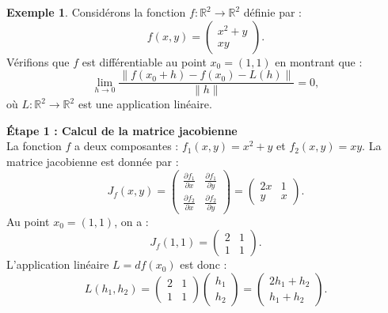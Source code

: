 \documentclass[a4paper,12pt,openany]{book}
\theoremstyle{plain}
\theoremstyle{definition}
\newtheorem{exemple}[theorem]{Exemple}
\theoremstyle{remark}
\theoremstyle{nbstyle}
\begin{document}
	
	\begin{exemple}
		Considérons la fonction \( f : \mathbb{R}^2 \to \mathbb{R}^2 \) définie par :
		\[
		f(x, y) = \begin{pmatrix}
		x^2 + y \\
		xy
		\end{pmatrix}.
		\]
		Vérifions que \( f \) est différentiable au point \( x_0 = (1, 1) \) en montrant que :
		\[
		\lim_{h \to 0} \frac{\lVert f(x_0 + h) - f(x_0) - L(h) \rVert}{\lVert h \rVert} = 0,
		\]
		où \( L : \mathbb{R}^2 \to \mathbb{R}^2 \) est une application linéaire.
		
		\textbf{Étape 1 : Calcul de la matrice jacobienne}\\
		La fonction \( f \) a deux composantes : \( f_1(x, y) = x^2 + y \) et \( f_2(x, y) = xy \). La matrice jacobienne est donnée par :
		\[
		J_f(x, y) = \begin{pmatrix}
		\frac{\partial f_1}{\partial x} & \frac{\partial f_1}{\partial y} \\
		\frac{\partial f_2}{\partial x} & \frac{\partial f_2}{\partial y}
		\end{pmatrix} = \begin{pmatrix}
		2x & 1 \\
		y & x
		\end{pmatrix}.
		\]
		Au point \( x_0 = (1, 1) \), on a :
		\[
		J_f(1, 1) = \begin{pmatrix}
		2 & 1 \\
		1 & 1
		\end{pmatrix}.
		\]
		L'application linéaire \( L = df(x_0) \) est donc :
		\[
		L(h_1, h_2) = \begin{pmatrix}
		2 & 1 \\
		1 & 1
		\end{pmatrix} \begin{pmatrix}
		h_1 \\
		h_2
		\end{pmatrix} = \begin{pmatrix}
		2h_1 + h_2 \\
		h_1 + h_2
		\end{pmatrix}.
		\]
		

\end{exemple}
\end{document}
